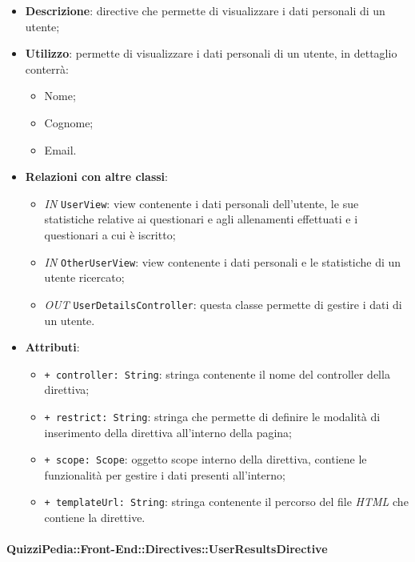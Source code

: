 \begin{itemize}
	\item \textbf{Descrizione}: directive che permette di visualizzare i dati personali di un utente;
	\item \textbf{Utilizzo}: permette di visualizzare i dati personali di un utente, in dettaglio conterrà:
	\begin{itemize}
		\item Nome;
		\item Cognome;
		\item Email.
	\end{itemize}
	\item \textbf{Relazioni con altre classi}:
	\begin{itemize}
		\item \textit{IN} \texttt{UserView}: view contenente i dati personali dell'utente, le sue statistiche relative ai questionari e agli allenamenti effettuati e i questionari a cui è iscritto;
		\item \textit{IN} \texttt{OtherUserView}: view contenente i dati personali e le statistiche di un utente ricercato;
		\item \textit{OUT} \texttt{UserDetailsController}: questa classe permette di gestire i dati di un utente.
	\end{itemize}
	\item \textbf{Attributi}:
	\begin{itemize}
		\item \texttt{+ controller: String}: stringa contenente il nome del controller della direttiva;
		\item \texttt{+ restrict: String}: stringa che permette di definire le modalità di inserimento della direttiva all'interno della pagina;
		\item \texttt{+ scope: Scope}: oggetto scope interno della direttiva, contiene le funzionalità per gestire i dati presenti all'interno;
		\item \texttt{+ templateUrl: String}: stringa contenente il percorso del file \textit{HTML} che contiene la direttive.
	\end{itemize}
\end{itemize}

\paragraph{QuizziPedia::Front-End::Directives::UserResultsDirective}

\label{QuizziPedia::Front-End::Directives::UserResultsDirective}

